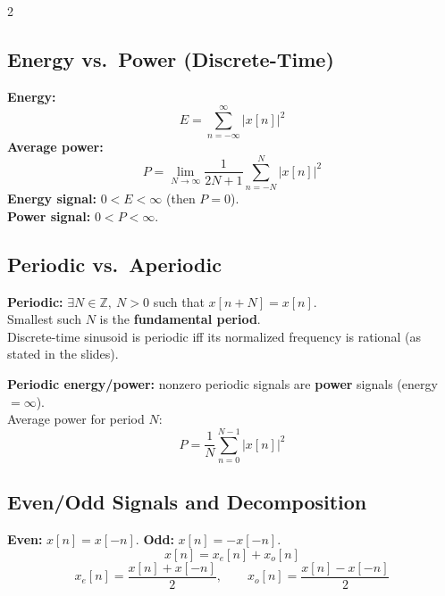 \documentclass[10pt]{article}
\begin{document}
\begin{multicols}{2}
\begin{center}
\end{center}

\subsection{Energy vs.\ Power (Discrete-Time)}
\textbf{Energy:}
\[
E = \sum_{n=-\infty}^{\infty} |x[n]|^2
\]
\textbf{Average power:}
\[
P = \lim_{N\to\infty}\frac{1}{2N+1}\sum_{n=-N}^{N} |x[n]|^2
\]
\textbf{Energy signal:} $0<E<\infty$ (then $P=0$).\\
\textbf{Power signal:} $0<P<\infty$.

\subsection{Periodic vs.\ Aperiodic}
\textbf{Periodic:} $\exists N\in\mathbb{Z},\ N>0$ such that $x[n+N]=x[n]$.\\
Smallest such $N$ is the \textbf{fundamental period}.\\
Discrete-time sinusoid is periodic iff its normalized frequency is rational (as stated in the slides).

\vspace{0.25em}
\textbf{Periodic energy/power:} nonzero periodic signals are \textbf{power} signals (energy $=\infty$).\\
Average power for period $N$:
\[
P = \frac{1}{N}\sum_{n=0}^{N-1} |x[n]|^2
\]

\subsection{Even/Odd Signals and Decomposition}
\textbf{Even:} $x[n]=x[-n]$.\quad
\textbf{Odd:} $x[n]=-x[-n]$.
\[
x[n] = x_e[n] + x_o[n]
\]
\[
x_e[n] = \frac{x[n] + x[-n]}{2},
\qquad
x_o[n] = \frac{x[n] - x[-n]}{2}
\]


\end{multicols}
\end{document}
